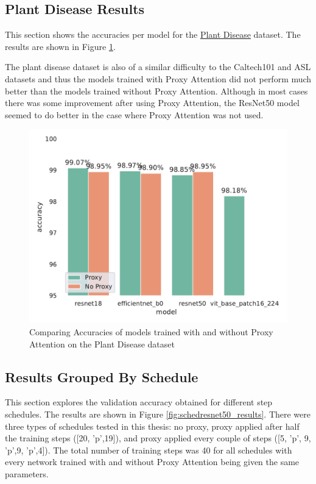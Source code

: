 \documentclass[a4paper,11pt,openright]{book}
\begin{document}
\subsection{Plant Disease Results}
This section shows the accuracies per model for the \href{https://www.kaggle.com/datasets/rajibdpi/plant-disease-dataset}{Plant Disease} dataset. The results are shown in Figure \ref{fig:plantdisease_results}. 

The plant disease dataset is also of a similar difficulty to the Caltech101 and ASL datasets and thus the models trained with Proxy Attention did not perform much better than the models trained without Proxy Attention. Although in most cases there was some improvement after using Proxy Attention, the ResNet50 model seemed to do better in the case where Proxy Attention was not used. 
\begin{figure}[!htb]
    \centering
    \includegraphics[width=.6\linewidth]{results/plantdisease_results.pdf}
    \caption{Comparing Accuracies of models trained with and without Proxy Attention on the Plant Disease dataset}
    \label{fig:plantdisease_results}
\end{figure}


\subsection{Results Grouped By Schedule}
This section explores the validation accuracy obtained for different step schedules. The results are shown in Figure \ref{fig:schedresnet50_results}. 
There were three types of schedules tested in this thesis: no proxy, proxy applied after half the training steps ([20, 'p',19]), and proxy applied every couple of steps ([5, 'p', 9, 'p',9, 'p',4]). The total number of training steps was 40 for all schedules with every network trained with and without Proxy Attention being given the same parameters. 
\end{document}
